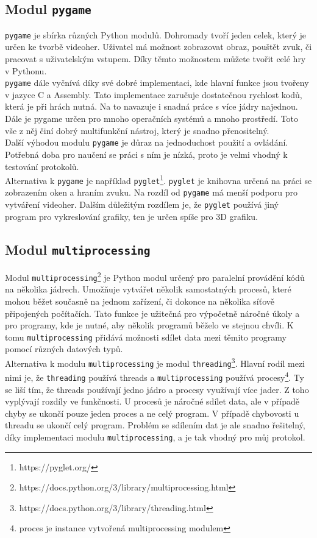 \documentclass[12pt]{report}			%
\begin{document}
\subsection{Modul \texttt{pygame}}
\texttt{pygame} je sbírka různých Python modulů. Dohromady tvoří jeden celek, který je určen ke tvorbě videoher. Uživatel má možnost zobrazovat obraz, pouštět zvuk, či pracovat s uživatelským vstupem. Díky těmto možnostem můžete tvořit celé hry v Pythonu. 
\\
\texttt{pygame} dále vyčnívá díky své dobré implementaci, kde hlavní funkce jsou tvořeny v jazyce C a Assembly. Tato implementace zaručuje dostatečnou rychlost kodů, která je při hrách nutná. Na to navazuje i snadná práce s více jádry najednou. Dále je pygame určen pro mnoho operačních systémů a mnoho prostředí. Toto vše z něj činí dobrý multifunkční nástroj, který je snadno přenositelný. 
\\
Další výhodou modulu \texttt{pygame} je důraz na jednoduchost použití a ovládání. Potřebná doba pro naučení se práci s ním je nízká, proto je velmi vhodný k testování protokolů.  
\\
Alternativa k \texttt{pygame} je například \texttt{pyglet}\footnote{https://pyglet.org/}. \texttt{pyglet} je knihovna určená na práci se zobrazením oken a hraním zvuku. Na rozdíl od \texttt{pygame} má menší podporu pro vytváření videoher. Dalším důležitým rozdílem je, že \texttt{pyglet} používá jiný program pro vykreslování grafiky, ten je určen spíše pro 3D grafiku. \cite{pygame}

\subsection{Modul \texttt{multiprocessing}}
Modul \texttt{multiprocessing}\footnote{https://docs.python.org/3/library/multiprocessing.html} je Python modul určený pro paralelní provádění kódů na několika jádrech. Umožňuje vytvářet několik samostatných procesů, které mohou běžet současně na jednom zařízení, či dokonce na několika síťově připojených počítačích. Tato funkce je užitečná pro výpočetně náročné úkoly a pro programy, kde je nutné, aby několik programů běželo ve stejnou chvíli. K tomu \texttt{multiprocessing} přidává možnosti sdílet data mezi těmito programy pomocí různých datových typů. 
\\
Alternativa k modulu \texttt{multiprocessing} je modul \texttt{threading}\footnote{https://docs.python.org/3/library/threading.html}. Hlavní rodíl mezi nimi je, že \texttt{threading} používá threads a \texttt{multiprocessing} používá procesy\footnote{proces je instance vytvořená multiprocessing modulem}. Ty se liší tím, že threads používají jedno jádro a procesy využívají více jader. Z toho vyplývají rozdíly ve funkčnosti. U procesů je náročné sdílet data, ale v případě chyby se ukončí pouze jeden proces a ne celý program. V případě chybovosti u threadu se ukončí celý program. Problém se sdílením dat je ale snadno řešitelný, díky implementaci modulu \texttt{multiprocessing}, a je tak vhodný pro můj protokol. 
\end{document}
